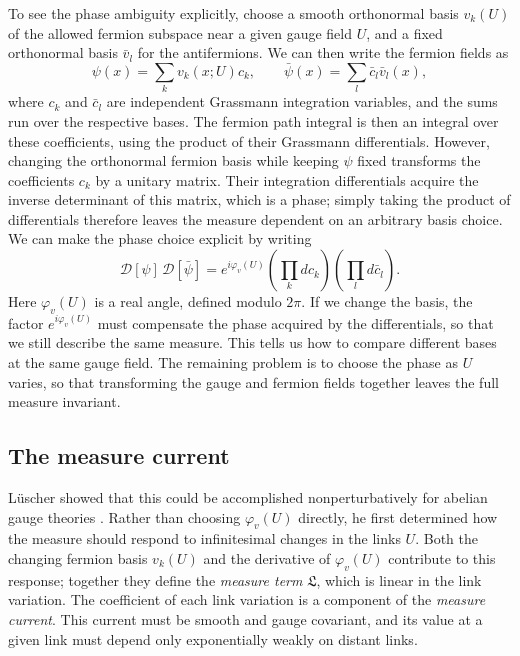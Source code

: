\documentclass[11pt,a4paper]{article}
\theoremstyle{remark}
\begin{document}
To see the phase ambiguity explicitly, choose a smooth orthonormal basis $v_k(U)$ of the allowed fermion subspace near a given gauge field $U$, and a fixed orthonormal basis $\bar v_l$ for the antifermions. We can then write the fermion fields as
\begin{equation}
 \psi(x)=\sum_k v_k(x;U)c_k,
 \qquad
 \bar\psi(x)=\sum_l\bar c_l\bar v_l(x),
\end{equation}
where $c_k$ and $\bar c_l$ are independent Grassmann integration variables, and the sums run over the respective bases. The fermion path integral is then an integral over these coefficients, using the product of their Grassmann differentials. However, changing the orthonormal fermion basis while keeping $\psi$ fixed transforms the coefficients $c_k$ by a unitary matrix. Their integration differentials acquire the inverse determinant of this matrix, which is a phase; simply taking the product of differentials therefore leaves the measure dependent on an arbitrary basis choice. We can make the phase choice explicit by writing
\begin{equation}
 \mathcal D[\psi]\,\mathcal D[\bar\psi]
 =e^{i\varphi_v(U)}
   \left(\prod_k dc_k\right)
   \left(\prod_l d\bar c_l\right).
\end{equation}
Here $\varphi_v(U)$ is a real angle, defined modulo $2\pi$. If we change the basis, the factor $e^{i\varphi_v(U)}$ must compensate the phase acquired by the differentials, so that we still describe the same measure. This tells us how to compare different bases at the same gauge field. The remaining problem is to choose the phase as $U$ varies, so that transforming the gauge and fermion fields together leaves the full measure invariant.

\subsection{The measure current}

L\"uscher showed that this could be accomplished nonperturbatively for abelian gauge theories \cite{LuscherAbelian}. Rather than choosing $\varphi_v(U)$ directly, he first determined how the measure should respond to infinitesimal changes in the links $U$. Both the changing fermion basis $v_k(U)$ and the derivative of $\varphi_v(U)$ contribute to this response; together they define the \emph{measure term} $\mathfrak L$, which is linear in the link variation. The coefficient of each link variation is a component of the \emph{measure current}. This current must be smooth and gauge covariant, and its value at a given link must depend only exponentially weakly on distant links.
\end{document}
